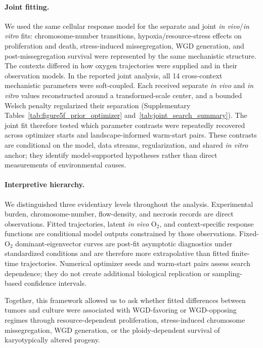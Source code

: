 \documentclass[11pt]{article}
\begin{document}
\paragraph{Joint fitting.}
We used the same cellular response model for the separate and joint \textit{in vivo}/\textit{in vitro} fits: chromosome-number transitions, hypoxia/resource-stress effects on proliferation and death, stress-induced missegregation, WGD generation, and post-missegregation survival were represented by the same mechanistic structure. The contexts differed in how oxygen trajectories were supplied and in their observation models. In the reported joint analysis, all 14 cross-context mechanistic parameters were soft-coupled. Each received separate \textit{in vivo} and \textit{in vitro} values reconstructed around a transformed-scale center, and a bounded Welsch penalty regularized their separation (Supplementary Tables~\ref{tab:figure5f_prior_optimizer} and~\ref{tab:joint_search_summary}). The joint fit therefore tested which parameter contrasts were repeatedly recovered across optimizer starts and landscape-informed warm-start pairs. These contrasts are conditional on the model, data streams, regularization, and shared \textit{in vitro} anchor; they identify model-supported hypotheses rather than direct measurements of environmental causes.

\paragraph{Interpretive hierarchy.}
We distinguished three evidentiary levels throughout the analysis. Experimental burden, chromosome-number, flow-density, and necrosis records are direct observations. Fitted trajectories, latent \textit{in vivo} O$_2$, and context-specific response functions are conditional model outputs constrained by those observations. Fixed-O$_2$ dominant-eigenvector curves are post-fit asymptotic diagnostics under standardized conditions and are therefore more extrapolative than fitted finite-time trajectories. Numerical optimizer seeds and warm-start pairs assess search dependence; they do not create additional biological replication or sampling-based confidence intervals.

Together, this framework allowed us to ask whether fitted differences between tumors and culture were associated with WGD-favoring or WGD-opposing regimes through resource-dependent proliferation, stress-induced chromosome missegregation, WGD generation, or the ploidy-dependent survival of karyotypically altered progeny.
\end{document}
